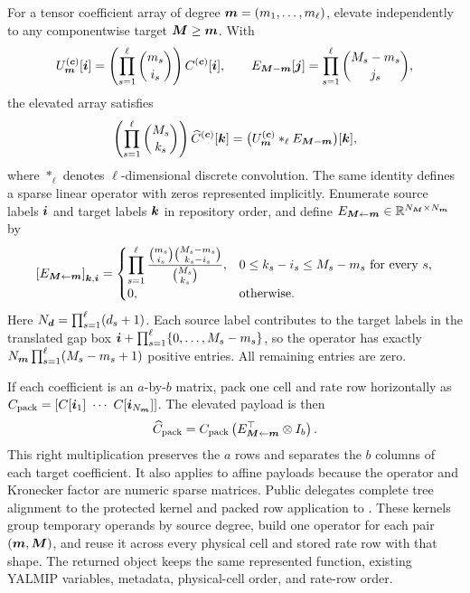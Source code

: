 For a tensor coefficient array of degree $\boldsymbol{m}=(m_1,\ldots,m_\ell)$, elevate independently to any componentwise target $\boldsymbol{M}\ge\boldsymbol{m}$. With
\begin{gather*}
  U_{\boldsymbol{m}}^{(\boldsymbol{c})}[\boldsymbol{i}]
  =\left(\prod_{s=1}^{\ell}\binom {m_s}{i_s}\right)
  C^{(\boldsymbol{c})}[\boldsymbol{i}],
  \qquad
  E_{\boldsymbol{M}-\boldsymbol{m}}[\boldsymbol{j}]
  =\prod_{s=1}^{\ell}\binom{M_s-m_s}{j_s},
\end{gather*}
the elevated array satisfies
\begin{gather*}
  \left(\prod_{s=1}^{\ell}\binom {M_s}{k_s}\right)
  \widehat C^{(\boldsymbol{c})}[\boldsymbol{k}]
  =
  \bigl(U_{\boldsymbol{m}}^{(\boldsymbol{c})}*_{\ell}E_{\boldsymbol{M}-\boldsymbol{m}}\bigr)[\boldsymbol{k}],
\end{gather*}
where $*_{\ell}$ denotes $\ell$-dimensional discrete convolution. The same identity defines a sparse linear operator with zeros represented implicitly. Enumerate source labels $\boldsymbol{i}$ and target labels $\boldsymbol{k}$ in repository order, and define $E_{\boldsymbol{M}\leftarrow\boldsymbol{m}}\in\mathbb R^{N_{\boldsymbol{M}}\times N_{\boldsymbol{m}}}$ by
\begin{gather*}
\left[E_{\boldsymbol{M}\leftarrow\boldsymbol{m}}\right]_{\boldsymbol{k},\boldsymbol{i}}=
\begin{cases}
\displaystyle\prod_{s=1}^{\ell}\frac{\binom{m_s}{i_s}\binom{M_s-m_s}{k_s-i_s}}{\binom{M_s}{k_s}}, & 0\le k_s-i_s\le M_s-m_s\text{ for every }s,\\[8pt]
0, & \text{otherwise}.
\end{cases}
\end{gather*}
Here $N_{\boldsymbol{d}}=\prod_{s=1}^{\ell}(d_s+1)$. Each source label contributes to the target labels in the translated gap box $\boldsymbol{i}+\prod_{s=1}^{\ell}\{0,\ldots,M_s-m_s\}$, so the operator has exactly $N_{\boldsymbol{m}}\prod_{s=1}^{\ell}(M_s-m_s+1)$ positive entries. All remaining entries are zero.

If each coefficient is an $a$-by-$b$ matrix, pack one cell and rate row horizontally as $C_{\mathrm{pack}}=[C[\vect{i}_1]\ \cdots\ C[\vect{i}_{N_{\vect{m}}}]]$. The elevated payload is then
\begin{gather*}
\widehat C_{\mathrm{pack}}=C_{\mathrm{pack}}\left(E_{\boldsymbol{M}\leftarrow\boldsymbol{m}}^\top \otimes I_b\right).
\end{gather*}
This right multiplication preserves the $a$ rows and separates the $b$ columns of each target coefficient. It also applies to affine  payloads because the operator and Kronecker factor are numeric sparse matrices. Public  delegates complete tree alignment to the protected  kernel and packed row application to . These kernels group temporary operands by source degree, build one operator for each pair $(\boldsymbol{m},\boldsymbol{M})$, and reuse it across every physical cell and stored rate row with that shape. The returned object keeps the same represented function, existing YALMIP variables, metadata, physical-cell order, and rate-row order.

